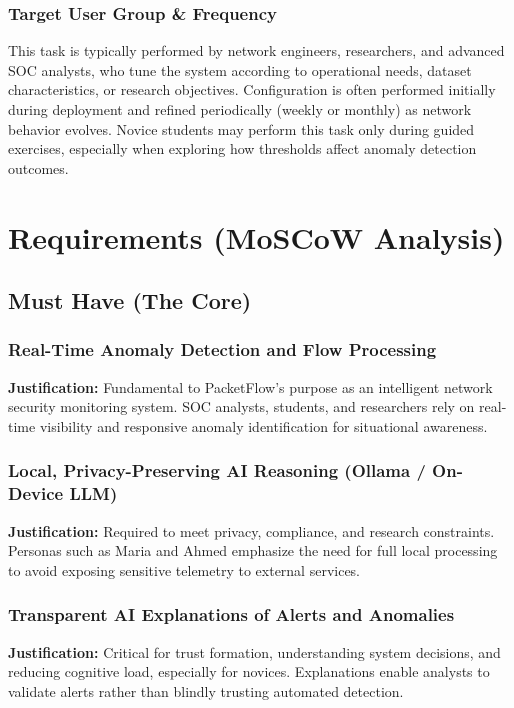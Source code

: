 \documentclass[
    11pt, 
    a4paper, 
    parskip=half, 
    headsepline,       %
    DIV=12             %
]{scrartcl}
\begin{document}
\subsubsection*{Target User Group \& Frequency}
This task is typically performed by network engineers, researchers, and advanced SOC analysts, who tune the system according to operational needs, dataset characteristics, or research objectives. Configuration is often performed initially during deployment and refined periodically (weekly or monthly) as network behavior evolves. Novice students may perform this task only during guided exercises, especially when exploring how thresholds affect anomaly detection outcomes.

\section{Requirements (MoSCoW Analysis)}

\subsection{Must Have (The Core)}

\subsubsection*{Real-Time Anomaly Detection and Flow Processing}
\noindent\textbf{Justification:}
Fundamental to PacketFlow’s purpose as an intelligent network security monitoring system. SOC analysts, students, and researchers rely on real-time visibility and responsive anomaly identification for situational awareness.

\subsubsection*{Local, Privacy-Preserving AI Reasoning (Ollama / On-Device LLM)}
\noindent\textbf{Justification:}
Required to meet privacy, compliance, and research constraints. Personas such as Maria and Ahmed emphasize the need for full local processing to avoid exposing sensitive telemetry to external services.

\subsubsection*{Transparent AI Explanations of Alerts and Anomalies}
\noindent\textbf{Justification:}
Critical for trust formation, understanding system decisions, and reducing cognitive load, especially for novices. Explanations enable analysts to validate alerts rather than blindly trusting automated detection.
\end{document}
